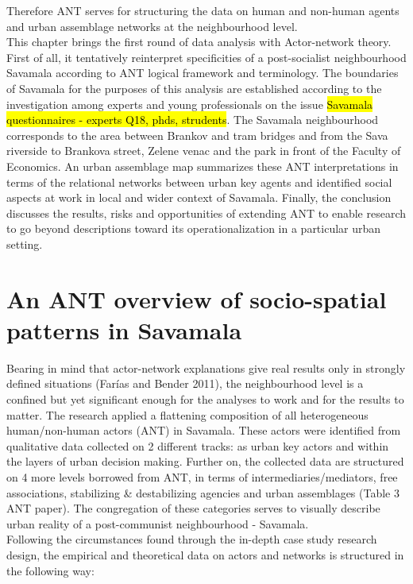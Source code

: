 \documentclass[11pt]{report}
\begin{document}
Therefore ANT serves for structuring the data on human and non-human agents and urban assemblage networks at the neighbourhood level.
\\
This chapter brings the first round of data analysis with Actor-network theory.
First of all, it tentatively reinterpret specificities of a post-socialist neighbourhood Savamala according to ANT logical framework and terminology. 
The boundaries of Savamala for the purposes of this analysis are established according to the investigation among experts and young professionals on the issue \hl{Savamala questionnaires - experts Q18, phds, strudents}. The Savamala neighbourhood corresponds to the area between Brankov and tram bridges and from the Sava riverside to Brankova street, Zelene venac and the park in front of the Faculty of Economics.
An urban assemblage map summarizes these ANT interpretations in terms of the relational networks between urban key agents and identified social aspects at work in local and wider context of Savamala.
Finally, the conclusion discusses the results, risks and opportunities of extending ANT to enable research to go beyond descriptions toward its operationalization in a particular urban setting.

\section{An ANT overview of socio-spatial patterns in Savamala}

Bearing in mind that actor-network explanations give real results only in strongly defined situations (Farías and Bender 2011), the neighbourhood level  is a confined but yet significant enough for the analyses to work and for the results to matter.
The research applied a flattening composition of all heterogeneous human/non-human actors (ANT)  in Savamala.
These actors were identified from qualitative data collected on 2 different tracks: as urban key actors and within the layers of urban decision making.
Further on, the collected data are structured on 4 more levels borrowed from ANT, in terms of intermediaries/mediators, free associations, stabilizing \& destabilizing agencies and urban assemblages (Table 3 ANT paper).
The congregation of these categories serves to visually describe urban reality of a post-communist neighbourhood - Savamala.
\\
Following the circumstances found through the in-depth case study research design, the empirical and theoretical data on actors and networks is structured in the following way:
\end{document}
